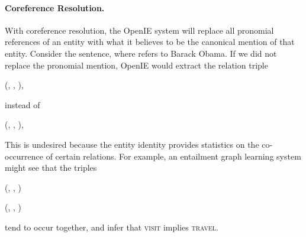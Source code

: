 \paragraph{Coreference Resolution.}
With coreference resolution, the OpenIE system will replace all
pronomial references of an entity with what it believes to be the canonical
mention of that entity. Consider the sentence, 
where  refers to Barack Obama. If we did not replace the pronomial
mention, OpenIE would extract the relation triple
\begin{center}
(, , ),
\end{center}
instead of 
\begin{center}
(, , ),
\end{center}
This is undesired because the entity identity provides statistics on 
the co-occurrence of certain relations. For example, an entailment
graph learning system might see that the triples
\begin{description}
  \item (, , )
  \item (, , )
\end{description}
tend to occur together, and infer that \textsc{visit} implies \textsc{travel}.


\citet{fader11reverb}
